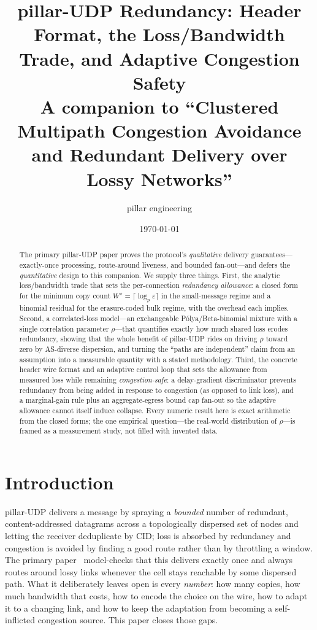 \documentclass[10pt,twocolumn]{article}
\title{\vspace{-3.5em}\bfseries pillar-UDP Redundancy: Header Format, the
Loss/Bandwidth Trade, and Adaptive Congestion Safety\\[0.35em]
\large\normalfont A companion to ``Clustered Multipath Congestion Avoidance and
Redundant Delivery over Lossy Networks''}
\author{\normalsize pillar engineering}
\date{\normalsize \today}
\newcommand{\Wstar}{W^{\star}}
\begin{document}
\maketitle

\begin{abstract}
\noindent
The primary pillar-UDP paper proves the protocol's \emph{qualitative} delivery
guarantees---exactly-once processing, route-around liveness, and bounded
fan-out---and defers the \emph{quantitative} design to this companion. We supply
three things. First, the analytic loss/bandwidth trade that sets the
per-connection \emph{redundancy allowance}: a closed form for the minimum copy
count $\Wstar=\lceil\log_p\varepsilon\rceil$ in the small-message regime and a
binomial residual for the erasure-coded bulk regime, with the overhead each
implies. Second, a correlated-loss model---an exchangeable P\'olya/Beta-binomial
mixture with a single correlation parameter $\rho$---that quantifies exactly how
much shared loss erodes redundancy, showing that the whole benefit of pillar-UDP
rides on driving $\rho$ toward zero by AS-diverse dispersion, and turning the
``paths are independent'' claim from an assumption into a measurable quantity
with a stated methodology. Third, the concrete header wire format and an adaptive
control loop that sets the allowance from measured loss while remaining
\emph{congestion-safe}: a delay-gradient discriminator prevents redundancy from
being added in response to congestion (as opposed to link loss), and a
marginal-gain rule plus an aggregate-egress bound cap fan-out so the adaptive
allowance cannot itself induce collapse. Every numeric result here is exact
arithmetic from the closed forms; the one empirical question---the real-world
distribution of $\rho$---is framed as a measurement study, not filled with
invented data.
\end{abstract}

\section{Introduction}
pillar-UDP delivers a message by spraying a \emph{bounded} number of redundant,
content-addressed datagrams across a topologically dispersed set of nodes and
letting the receiver deduplicate by CID; loss is absorbed by redundancy and
congestion is avoided by finding a good route rather than by throttling a
window. The primary paper~\cite{primary} model-checks that this delivers exactly
once and always routes around lossy links whenever the cell stays reachable by
some dispersed path. What it deliberately leaves open is every \emph{number}: how
many copies, how much bandwidth that costs, how to encode the choice on the wire,
how to adapt it to a changing link, and how to keep the adaptation from becoming
a self-inflicted congestion source. This paper closes those gaps.
\end{document}
